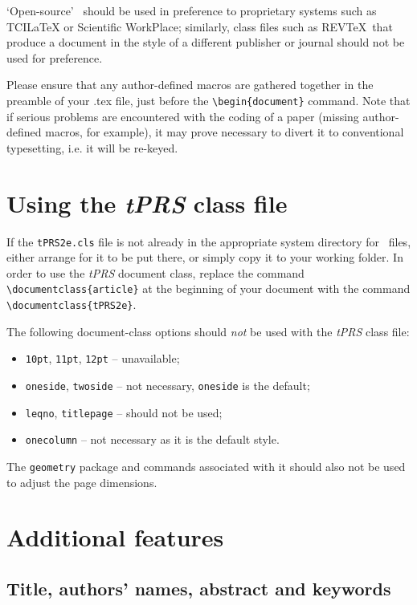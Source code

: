 \documentclass{tPRS2e}
\begin{document}
`Open-source' \LaTeXe\ should be used in preference to proprietary systems such as TCILaTeX or Scientific WorkPlace; similarly, class files such as REV\TeX\ that produce a document in the style of a different publisher or journal should not be used for preference.

Please ensure that any author-defined macros are gathered together in the preamble of your .tex file, just before the
\verb"\begin{document}" command. Note that if serious problems are encountered with the coding of a paper (missing author-defined macros,
for example), it may prove necessary to divert it to conventional typesetting, i.e. it will be re-keyed.


\section{Using the \textit{tPRS} class file}

If the \texttt{tPRS2e.cls} file is not already in the appropriate system directory for \LaTeXe\ files, either
arrange for it to be put there, or simply copy it to your working folder. In order to use the \textit{tPRS} document class, replace the command
\verb"\documentclass{article}" at the beginning of your document with the command \verb"\documentclass{tPRS2e}".

The following document-class options should \emph{not} be used with the \textit{tPRS} class file:
\begin{itemize}
  \item \texttt{10pt}, \texttt{11pt}, \texttt{12pt} -- unavailable;
  \item \texttt{oneside}, \texttt{twoside} -- not necessary, \texttt{oneside} is the default;
  \item \texttt{leqno}, \texttt{titlepage} -- should not be used;
  \item \texttt{onecolumn} -- not necessary as it is the default style.
\end{itemize}
The \texttt{geometry} package and commands associated with it should also not be used to adjust the page dimensions.


\section{Additional features}

\subsection{Title, authors' names, abstract and keywords}
\end{document}
